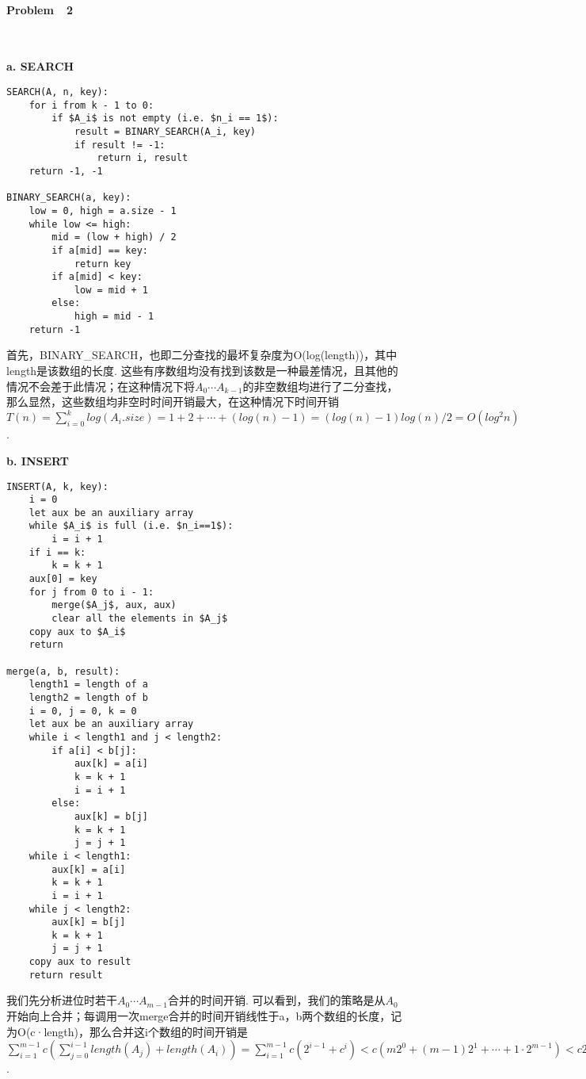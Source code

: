 \documentclass[UTF8]{ctexart}
\begin{document}
\paragraph*{Problem\ \ 2}\ \par
\textbf{a. SEARCH}\par
\begin{lstlisting}[mathescape=true]
SEARCH(A, n, key):
    for i from k - 1 to 0:
        if $A_i$ is not empty (i.e. $n_i == 1$):
            result = BINARY_SEARCH(A_i, key)
            if result != -1:
                return i, result
    return -1, -1

BINARY_SEARCH(a, key):
    low = 0, high = a.size - 1
    while low <= high:
        mid = (low + high) / 2
        if a[mid] == key:
            return key
        if a[mid] < key:
            low = mid + 1
        else:
            high = mid - 1
    return -1
\end{lstlisting}\par
首先，BINARY\_SEARCH，也即二分查找的最坏复杂度为O(log(length))，其中length是该数组的长度. 这些有序数组均没有找到该数是一种最差情况，且其他的情况不会差于此情况；在这种情况下将$A_0\cdots A_{k-1}$的非空数组均进行了二分查找，那么显然，这些数组均非空时时间开销最大，在这种情况下时间开销$T(n)=\sum_{i=0}^k log(A_i.size)=1+2+\cdots+(log(n)-1)=(log(n)-1)log(n)/2=O(log^2n)$.\par
\textbf{b. INSERT}\par
\begin{lstlisting}[mathescape=true]
INSERT(A, k, key):
    i = 0
    let aux be an auxiliary array    
    while $A_i$ is full (i.e. $n_i==1$):
        i = i + 1
    if i == k:
        k = k + 1
    aux[0] = key
    for j from 0 to i - 1:
        merge($A_j$, aux, aux)
        clear all the elements in $A_j$
    copy aux to $A_i$
    return

merge(a, b, result):
    length1 = length of a
    length2 = length of b
    i = 0, j = 0, k = 0
    let aux be an auxiliary array    
    while i < length1 and j < length2:
        if a[i] < b[j]:
            aux[k] = a[i]
            k = k + 1
            i = i + 1
        else:
            aux[k] = b[j]
            k = k + 1
            j = j + 1
    while i < length1:
        aux[k] = a[i]
        k = k + 1
        i = i + 1
    while j < length2:
        aux[k] = b[j]
        k = k + 1
        j = j + 1
    copy aux to result
    return result
\end{lstlisting}
我们先分析进位时若干$A_0\cdots A_{m-1}$合并的时间开销. 可以看到，我们的策略是从$A_0$开始向上合并；每调用一次merge合并的时间开销线性于a，b两个数组的长度，记为O(c·length)，那么合并这i个数组的时间开销是$\sum_{i=1}^{m-1}c(\sum_{j=0}^{i-1}length(A_j)+length(A_i))=\sum_{i=1}^{m-1}c(2^{i-1}+c^i)<c(m2^0+(m-1)2^1+\cdots+1\cdot 2^{m-1})<c2^{m+1}=O(2^m)$.\par
\end{document}
